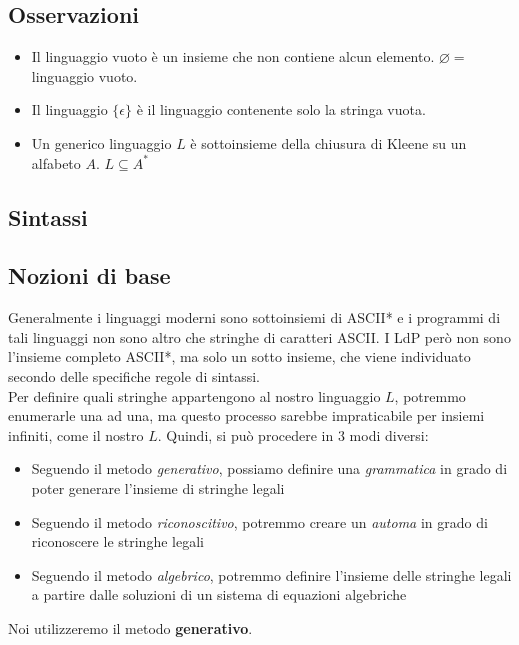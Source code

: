 \documentclass{article}
\begin{document}
\subsection*{Osservazioni}
\begin{itemize}
  \item Il linguaggio vuoto è un insieme che non contiene alcun elemento. \(\varnothing = \) linguaggio vuoto.
  \item Il linguaggio \(\{ \epsilon \}\) è il linguaggio contenente solo la stringa vuota.
  \item Un generico linguaggio \(L\) è sottoinsieme della chiusura di Kleene su un alfabeto \(A\). \(L \subseteq A^*\)
\end{itemize}
\pagebreak

\subsection{Sintassi}
\subsection*{Nozioni di base}
Generalmente i linguaggi moderni sono sottoinsiemi di ASCII* e i programmi di tali linguaggi non sono altro che stringhe di caratteri ASCII. I LdP però non sono l'insieme completo ASCII*, ma solo un sotto insieme, che viene individuato secondo delle specifiche regole di sintassi.\\
Per definire quali stringhe appartengono al nostro linguaggio \(L\), potremmo enumerarle una ad una, ma questo processo sarebbe impraticabile per insiemi infiniti, come il nostro \(L\). Quindi, si può procedere in 3 modi diversi:
\begin{itemize}
  \item Seguendo il metodo \emph{generativo}, possiamo definire una \emph{grammatica} in grado di poter generare l'insieme di stringhe legali
  \item Seguendo il metodo \emph{riconoscitivo}, potremmo creare un \emph{automa} in grado di riconoscere le stringhe legali
  \item Seguendo il metodo \emph{algebrico}, potremmo definire l'insieme delle stringhe legali a partire dalle soluzioni di un sistema di equazioni algebriche
\end{itemize}
Noi utilizzeremo il metodo \textbf{generativo}.
\end{document}
